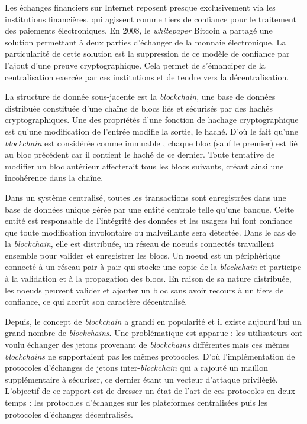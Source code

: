 Les échanges financiers sur Internet reposent presque exclusivement via les institutions financières, qui
agissent comme tiers de confiance pour le traitement des paiements électroniques.
En 2008, le \textit{whitepaper} Bitcoin \cite{Bitcoin} a partagé une solution permettant à deux parties d'échanger de
la monnaie électronique. La particularité de cette solution est la suppression de ce modèle de confiance par
l'ajout d'une preuve cryptographique. Cela permet de s'émanciper de la centralisation exercée par ces 
institutions et de tendre vers la décentralisation.
\newline

La structure de donnée sous-jacente est la \textit{\gls{blockchain}}, une base de données distribuée constituée 
d’une chaîne de blocs liés et sécurisés par des hachés cryptographiques. Une des propriétés 
d'une \gls{fonction de hachage cryptographique} est qu'une modification de l'entrée modifie la sortie, le haché.
D'où le fait qu'une \textit{\gls{blockchain}} est considérée comme immuable , chaque bloc (sauf le premier) 
est lié au bloc précédent car il contient le haché de ce dernier. Toute tentative de modifier un bloc antérieur 
affecterait tous les blocs suivants, créant ainsi une incohérence dans la chaîne.
\newline

Dans un système centralisé, toutes les transactions sont enregistrées dans une base de données unique gérée 
par une entité centrale telle qu'une banque. Cette entité est responsable de l'intégrité des données
et les usagers lui font confiance que toute modification involontaire ou malveillante sera détectée. 
Dans le cas de la \textit{\gls{blockchain}}, elle est distribuée, un réseau de noeuds connectés travaillent ensemble pour valider et enregistrer les blocs. 
Un noeud est un périphérique connecté à un réseau pair à pair qui stocke une copie de la \textit{\gls{blockchain}} et participe à la validation 
et à la propagation des blocs. En raison de sa nature distribuée, les noeuds peuvent valider et ajouter un bloc sans avoir 
recours à un tiers de confiance, ce qui accrût son caractère décentralisé.
\newline

Depuis, le concept de \textit{\gls{blockchain}} a grandi en popularité et il existe aujourd'hui un grand nombre de \textit{\gls{blockchain}s}.
Une problématique est apparue : les utilisateurs ont voulu échanger des jetons provenant de \textit{\gls{blockchain}s} différentes mais ces
mêmes \textit{\gls{blockchain}s} ne supportaient pas les mêmes protocoles.
D'où l'implémentation de protocoles d'échanges de jetons inter-\textit{\gls{blockchain}} qui a rajouté un maillon supplémentaire à sécuriser, 
ce dernier étant un vecteur d'attaque privilégié.
L'objectif de ce rapport est de dresser un état de l'art de ces protocoles en deux temps : les protocoles d'échanges sur les 
plateformes centralisées puis les protocoles d'échanges décentralisés.
